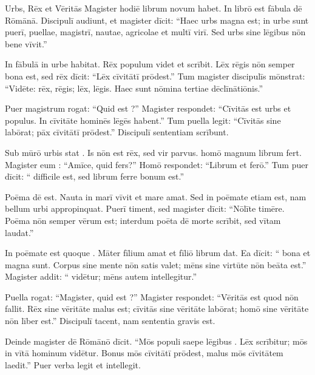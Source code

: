 \documentclass[12pt]{nextbook}
\begin{document}
\begin{readersection}{Urbs, Rēx et Vēritās}
Magister hodiē librum novum habet. In librō est fābula dē  Rōmānā. Discipulī audiunt, et magister dīcit: “Haec urbs magna est; in urbe sunt puerī, puellae, magistrī, nautae, agricolae et multī virī. Sed urbs sine lēgibus nōn bene vīvit.”

In fābulā  in urbe habitat. Rēx populum videt et  scrībit. Lēx rēgis nōn semper bona est, sed rēx dīcit: “Lēx cīvitātī prōdest.” Tum magister discipulīs mōnstrat: “Vidēte: rēx, rēgis; lēx, lēgis. Haec sunt nōmina tertiae dēclīnātiōnis.”

Puer magistrum rogat: “Quid est ?” Magister respondet: “Cīvitās est urbs et populus. In cīvitāte hominēs lēgēs habent.” Tum puella legit: “Cīvitās sine  labōrat; pāx cīvitātī prōdest.” Discipulī sententiam scrībunt.

Sub mūrō urbis stat . Is nōn est rēx, sed vir parvus.  homō magnum librum fert. Magister eum : “Amīce, quid fers?” Homō respondet: “Librum et  ferō.” Tum puer dīcit: “ difficile est, sed librum ferre bonum est.”

Poēma dē  est. Nauta in marī vīvit et mare amat. Sed in poēmate etiam  est, nam bellum urbi appropinquat. Puerī timent, sed magister dīcit: “Nōlīte timēre. Poēma nōn semper vērum est; interdum poēta dē morte scrībit, sed vītam laudat.”

In poēmate est quoque . Māter fīlium amat et fīliō librum dat. Ea dīcit: “ bona et  magna sunt. Corpus sine mente nōn satis valet; mēns sine virtūte nōn beāta est.” Magister addit: “ vidētur; mēns autem intellegitur.”

Puella rogat: “Magister, quid est ?” Magister respondet: “Vēritās est quod nōn fallit. Rēx sine vēritāte malus est; cīvitās sine vēritāte labōrat; homō sine vēritāte nōn līber est.” Discipulī tacent, nam sententia gravis est.

Deinde magister dē  Rōmānō dīcit. “Mōs populi saepe lēgibus . Lēx scrībitur; mōs in vītā hominum vidētur. Bonus mōs cīvitātī prōdest, malus mōs cīvitātem laedit.” Puer verba legit et intellegit.


\end{readersection}
\end{document}

